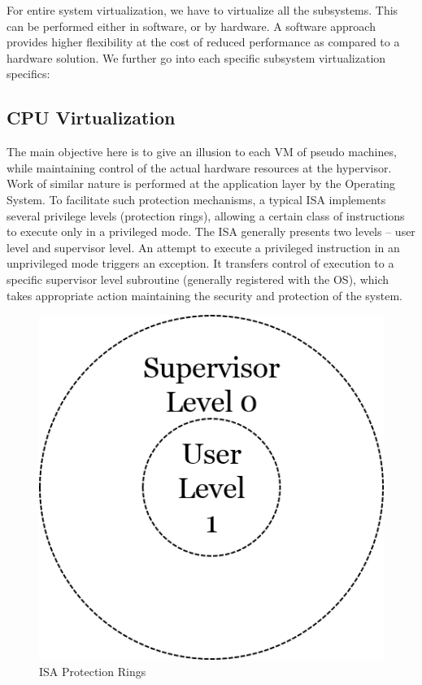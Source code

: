 For entire system virtualization, we have to virtualize all the subsystems. This can be performed either in software, or by hardware. A software approach provides higher flexibility at the cost of reduced performance as compared to a hardware solution. We further go into each specific subsystem virtualization specifics: 


\subsection{CPU Virtualization}

The main objective here is to give an illusion to each VM of pseudo machines, while maintaining control of the actual hardware resources at the hypervisor. Work of similar nature is performed at the application layer by the Operating System. To facilitate such protection mechanisms, a typical ISA implements several privilege levels (protection rings), allowing a certain class of instructions to execute only in a privileged mode. The ISA generally presents two levels -- user level and supervisor level. An attempt to execute a privileged instruction in an unprivileged mode triggers an exception. It transfers control of execution to a specific supervisor level subroutine (generally registered with the OS), which takes appropriate action maintaining the security and protection of the system. 



\setlength{\belowcaptionskip}{-10pt}

\begin{figure}[H]
  \centering
  \includegraphics[scale=0.6]{figures/protect_levels.png}
  \caption{ISA Protection Rings}
  \label{fig:protect_2}
\end{figure}

